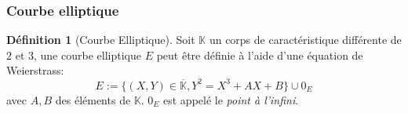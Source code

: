 \documentclass[10pt,a4paper]{beamer}
\theoremstyle{plain}
\theoremstyle{definition}
\theoremstyle{definition}
\theoremstyle{definition}
\theoremstyle{definition}
\newtheorem{defi}[thm]{Définition}
\theoremstyle{remark}
\theoremstyle{remark}
\theoremstyle{definition}
\begin{document}
\begin{frame}
\frametitle{Courbe elliptique }

\begin{defi}[Courbe Elliptique]
Soit $\mathbb{K}$ un corps de caractéristique différente de $2$ et $3$, une courbe elliptique $E$ peut être définie à l'aide d'une équation de Weierstrass: 
\begin{equation*}
\label{eq:weierstrass-proj}
E:=\{ (X,Y) \in \overline{\mathbb{K}} , Y^2=X^3+AX+B \} \cup 0_E
\end{equation*}
avec $A,B$ des éléments de $\mathbb{K}$. $0_E$ est appelé le \emph{point à l'infini}. 
\end{defi}

\begin{figure}
\begin{center}

\end{center}
\end{figure}
\end{frame}
\end{document}
